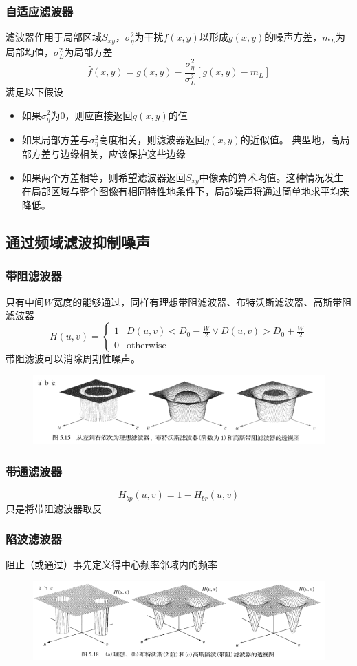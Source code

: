 \subsubsection{自适应滤波器}
滤波器作用于局部区域$S_{xy}$，$\sigma^2_\eta$为干扰$f(x,y)$以形成$g(x,y)$的噪声方差，$m_L$为局部均值，$\sigma_L^2$为局部方差
\[\hat{f}(x,y)=g(x,y)-\frac{\sigma^2_\eta}{\sigma^2_L}[g(x,y)-m_L]\]
满足以下假设
\begin{itemize}
	\item 如果$\sigma_\eta^2$为$0$，则应直接返回$g(x,y)$的值
	\item 如果局部方差与$\sigma_\eta^2$高度相关，则滤波器返回$g(x,y)$的近似值。
	典型地，高局部方差与边缘相关，应该保护这些边缘
	\item 如果两个方差相等，则希望滤波器返回$S_{xy}$中像素的算术均值。这种情况发生在局部区域与整个图像有相同特性地条件下，局部噪声将通过简单地求平均来降低。
\end{itemize}

\subsection{通过频域滤波抑制噪声}
\subsubsection{带阻滤波器}
只有中间$W$宽度的能够通过，同样有理想带阻滤波器、布特沃斯滤波器、高斯带阻滤波器
\[H(u,v)=\begin{cases}
1 & D(u,v)<D_0-\frac{W}{2}\lor D(u,v)>D_0+\frac{W}{2}\\
0 & \text{otherwise}
\end{cases}\]
带阻滤波可以消除周期性噪声。
\begin{figure}[H]
\centering
\includegraphics[width=0.8\linewidth]{fig/BSF.png}
\end{figure}

\subsubsection{带通滤波器}
\[H_{bp}(u,v)=1-H_{br}(u,v)\]
只是将带阻滤波器取反

\subsubsection{陷波滤波器}
阻止（或通过）事先定义得中心频率邻域内的频率
\begin{figure}[H]
\centering
\includegraphics[width=0.8\linewidth]{fig/notch.png}
\end{figure}

